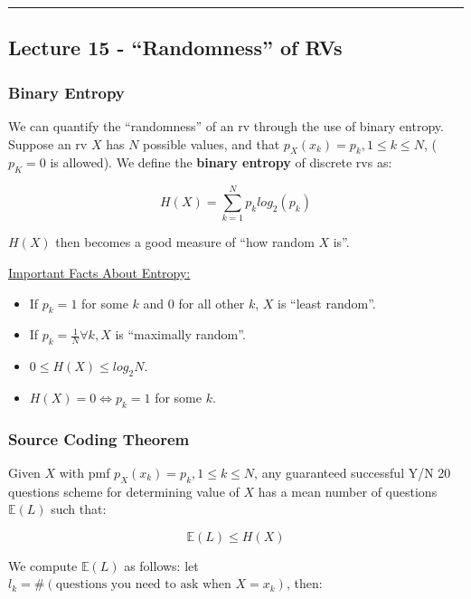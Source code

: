 \documentclass{article}
\begin{document}
\medskip\hrule
\subsection{Lecture 15 - ``Randomness'' of RVs}

\subsubsection{Binary Entropy}

We can quantify the ``randomness'' of an rv through the use of binary
entropy. Suppose an rv $X$ has $N$ possible values, and that $p_X(x_k)
= p_k, 1\leq k\leq N$, ($p_K=0$ is allowed). We define the
\textbf{binary entropy} of discrete rvs as:

\begin{equation}
  \tag{Binary Entroy of RVs}
  \boxed{
    H(X) = \sum_{k=1}^{N} p_klog_2(p_k)
  }
\end{equation}

$H(X)$ then becomes a good measure of ``how random $X$ is''.

\bigskip
\underline{Important Facts About Entropy:}

\begin{itemize}
\item If $p_k = 1$ for some $k$ and $0$ for all other $k$, $X$ is
  ``least random''.

\item If $p_k = \frac{1}{N} \forall k, X$ is ``maximally random''.
  
\item $0 \leq H(X) \leq log_2N$.
  
\item $H(X) = 0 \Leftrightarrow p_k = 1$ for some $k$.
\end{itemize}

\subsubsection{Source Coding Theorem}

Given $X$ with pmf $p_X(x_k) = p_k, 1 \leq k \leq N$, any guaranteed
successful Y/N 20 questions scheme for determining value of $X$ has a
mean number of questions $\mathbb{E}(L)$ such that:

\begin{equation}
  \tag{Source Coding Theorm}
  \boxed{
    \mathbb{E}(L) \leq H(X)
  }
\end{equation}

We compute $\mathbb{E}(L)$ as follows: let $l_k = \#(\text{questions
  you need to ask when } X = x_k)$, then:
\end{document}
